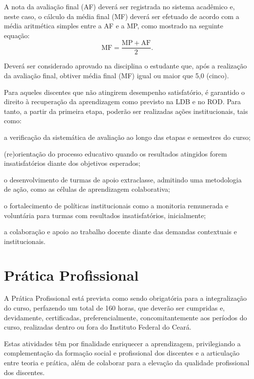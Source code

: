 \documentclass[
	12pt,				%
	openright,			%
	twoside,			%
	a4paper,			%
	chapter=TITLE,		%
	english,			%
	french,				%
	spanish,			%
	brazil,				%
	]{abntex2}
\begin{document}
A nota da avaliação final (AF) deverá ser registrada no sistema acadêmico e, neste caso, o cálculo da média final (MF) deverá ser efetuado de acordo com a média aritmética simples entre a AF e a MP, como mostrado na seguinte equação:
\[
    \mathrm{MF} = \frac{ \mathrm{MP} + \mathrm{AF}}{2}.
\]

Deverá ser considerado aprovado na disciplina o estudante que, após a realização da avaliação final, obtiver média final (MF) igual ou maior que 5,0 (cinco).

Para aqueles discentes que não atingirem desempenho satisfatório, é garantido o direito à recuperação da aprendizagem como previsto na LDB e no ROD. Para tanto, a partir da primeira etapa, poderão ser realizadas ações institucionais, tais como:
\begin{alineas}
	\item a verificação da sistemática de avaliação ao longo das etapas e semestres do curso;
 	\item (re)orientação do processo educativo quando os resultados atingidos forem insatisfatórios diante dos objetivos esperados;
 	\item o desenvolvimento de turmas de apoio extraclasse, admitindo uma metodologia de ação, como as células de aprendizagem colaborativa;
 	\item o fortalecimento de políticas institucionais como a monitoria remunerada e voluntária para turmas com resultados insatisfatórios, inicialmente;
 	\item a colaboração e apoio ao trabalho docente diante das demandas contextuais e institucionais.
\end{alineas}



\section{Pr\'atica Profissional}

A  Prática Profissional está prevista como sendo obrigatória para a integralização do curso, perfazendo um total de 160 horas, que deverão ser cumpridas e, devidamente, certificadas, preferencialmente, concomitantemente aos períodos do curso, realizadas dentro ou fora do Instituto Federal do Ceará.

Estas atividades têm por finalidade enriquecer a aprendizagem, privilegiando a complementação da formação social e profissional dos discentes e a articulação entre teoria e prática, além de colaborar para a elevação da qualidade profissional dos discentes.
\end{document}
